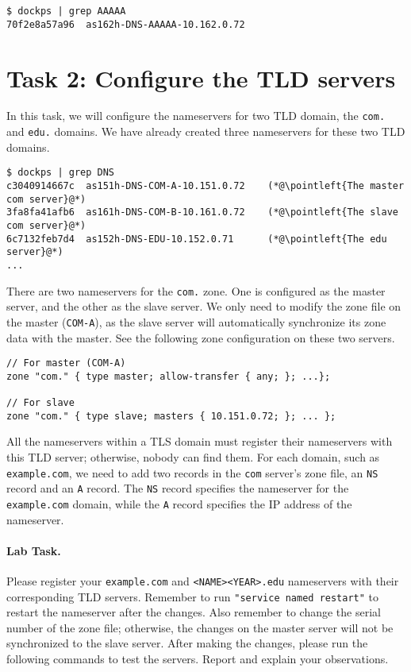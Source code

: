 \begin{lstlisting}
$ dockps | grep AAAAA
70f2e8a57a96  as162h-DNS-AAAAA-10.162.0.72
\end{lstlisting}




\section{Task 2: Configure the TLD servers}


In this task, we will configure the nameservers for two TLD domain,
the \texttt{com.} and \texttt{edu.} domains. We have already created
three nameservers for these two TLD domains. 

\begin{lstlisting}
$ dockps | grep DNS
c3040914667c  as151h-DNS-COM-A-10.151.0.72    (*@\pointleft{The master com server}@*) 
3fa8fa41afb6  as161h-DNS-COM-B-10.161.0.72    (*@\pointleft{The slave com server}@*)
6c7132feb7d4  as152h-DNS-EDU-10.152.0.71      (*@\pointleft{The edu server}@*)
...
\end{lstlisting}
 
There are two nameservers for the \texttt{com.} zone. One is configured as 
the master server, and the other as the slave server. 
We only need to modify the zone file on the master (\texttt{COM-A}), 
as the slave server will automatically synchronize its 
zone data with the master. See the following zone configuration
on these two servers. 

\begin{lstlisting}
// For master (COM-A)
zone "com." { type master; allow-transfer { any; }; ...};

// For slave
zone "com." { type slave; masters { 10.151.0.72; }; ... };
\end{lstlisting}


All the nameservers within a TLS domain
must register their nameservers with this
TLD server; otherwise, nobody can find them. 
For each domain, such as \texttt{example.com},  
we need to add two records in the \texttt{com} server's
zone file, an \texttt{NS} record and an \texttt{A} record.
The \texttt{NS} record specifies the nameserver for the
\texttt{example.com} domain, while the \texttt{A} record
specifies the IP address of the nameserver. 


\paragraph{Lab Task.}
Please register your \texttt{example.com} and \texttt{<NAME><YEAR>.edu} 
nameservers with their corresponding TLD servers. Remember to run
\texttt{"service named restart"}  to restart the nameserver after the
changes. Also remember to change the serial number of the zone file; otherwise,
the changes on the master server will not be synchronized to the 
slave server. After making the changes, please run the following commands
to test the servers. 
Report and explain your observations. 

